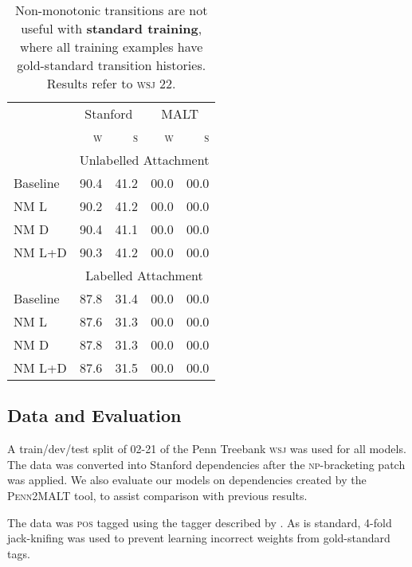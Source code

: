 \documentclass[11pt,letterpaper]{article}
\newcommand{\pos}{\textsc{pos}\xspace}
\newcommand{\wsj}{\textsc{wsj}\xspace}
\begin{document}
\begin{table}[t]

    \small
    \centering
    \begin{tabular}{l|rrrr}
        \hline
        & \multicolumn{2}{c}{Stanford} & \multicolumn{2}{c}{MALT}  \\
        & \textsc{w}  & \textsc{s} & \textsc{w} & \textsc{s} \\
\hline \hline
        & \multicolumn{4}{c}{Unlabelled Attachment} \\
        \hline
Baseline & 90.4 & 41.2 & 00.0 & 00.0 \\
NM L & 90.2 & 41.2 & 00.0 & 00.0 \\
NM D & 90.4 & 41.1 & 00.0 & 00.0 \\
NM L+D & 90.3 & 41.2 & 00.0 & 00.0 \\
\hline
            & \multicolumn{4}{c}{Labelled Attachment} \\
            \hline
Baseline & 87.8 & 31.4 & 00.0 & 00.0 \\
NM L & 87.6 & 31.3 & 00.0 & 00.0 \\
NM D & 87.8 & 31.3 & 00.0 & 00.0 \\
NM L+D & 87.6 & 31.5 & 00.0 & 00.0 \\
\hline
    \end{tabular}
    \caption{\small Non-monotonic transitions are not useful with
        \textbf{standard training},
where all training examples have gold-standard transition histories. Results refer to
\wsj 22.\label{tab:standard}}
\end{table}


\subsection{Data and Evaluation}

A train/dev/test split of 02-21 of the Penn Treebank \textsc{wsj} \citep{marcus:94}
was used for all models. The data was converted into
Stanford dependencies \citep{stanford_deps} after the \citet{vadas:07}
\textsc{np}-bracketing patch was applied. We also evaluate our models on
dependencies created by the \textsc{Penn2MALT} tool, to assist comparison 
with previous results.

The data was \pos tagged using the tagger described by \citep{zhang_pos:11}.
As is standard, 4-fold jack-knifing was used to prevent learning incorrect
weights from gold-standard tags.
\end{document}
